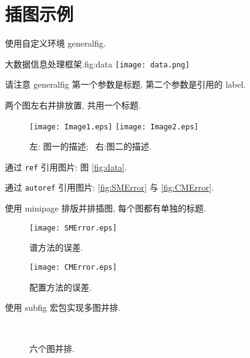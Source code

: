 \documentclass{shnuthesis}
\begin{document}
\section{插图示例}

使用自定义环境 generalfig.

\begin{generalfig}[htb]{大数据信息处理框架.}{fig:data}
		\texttt{[image: data.png]}
\end{generalfig}

请注意 generalfig 第一个参数是标题, 第二个参数是引用的 label.

两个图左右并排放置, 共用一个标题.
\begin{figure}[htp!]
\centering
  \texttt{[image: Image1.eps]} %
  \hfill
  \texttt{[image: Image2.eps]}
  \caption{左: 图一的描述;~ 右:图二的描述.}
  \label{fig:image}
\end{figure}

通过 \verb|ref| 引用图片: 图 \ref{fig:data}.

通过 \verb|autoref| 引用图片: \autoref{fig:SMError} 与 \autoref{fig:CMError}.


使用 minipage 排版并排插图, 每个图都有单独的标题.

\begin{figure}[htp!]
\begin{minipage}[t]{0.48\linewidth}
\centering
  \texttt{[image: SMError.eps]}
    \caption{谱方法的误差.}
    \label{fig:SMError}
\end{minipage}
  \hfill
\begin{minipage}[t]{0.48\linewidth}
\centering
   \texttt{[image: CMError.eps]}
   \caption{配置方法的误差.}
   \label{fig:CMError}
\end{minipage}
\end{figure}

使用 subfig 宏包实现多图并排.
\begin{figure}[htp!]
\centering
{}
\hfill
{}
\hfill
{} \\
\hfill
{}
\hfill
{}
\caption{六个图并排.}
\end{figure}
\end{document}

